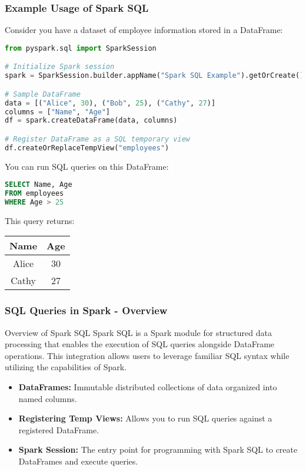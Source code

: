 \documentclass[aspectratio=169]{beamer}
\begin{document}
\begin{frame}[fragile]
    \frametitle{Example Usage of Spark SQL}
    Consider you have a dataset of employee information stored in a DataFrame:

    \begin{lstlisting}[language=Python]
from pyspark.sql import SparkSession

# Initialize Spark session
spark = SparkSession.builder.appName("Spark SQL Example").getOrCreate()

# Sample DataFrame
data = [("Alice", 30), ("Bob", 25), ("Cathy", 27)]
columns = ["Name", "Age"]
df = spark.createDataFrame(data, columns)

# Register DataFrame as a SQL temporary view
df.createOrReplaceTempView("employees")
    \end{lstlisting}

    You can run SQL queries on this DataFrame:
    \begin{lstlisting}[language=SQL]
SELECT Name, Age
FROM employees
WHERE Age > 25
    \end{lstlisting}

    This query returns:
    \begin{tabular}{|c|c|}
        \hline
        Name  & Age \\
        \hline
        Alice & 30  \\
        Cathy & 27  \\
        \hline
    \end{tabular}
\end{frame}

\begin{frame}[fragile]
  \frametitle{SQL Queries in Spark - Overview}
  \begin{block}{Overview of Spark SQL}
    Spark SQL is a Spark module for structured data processing that enables the execution of SQL queries alongside DataFrame operations. This integration allows users to leverage familiar SQL syntax while utilizing the capabilities of Spark.
  \end{block}

  \begin{itemize}
    \item \textbf{DataFrames:} Immutable distributed collections of data organized into named columns.
    \item \textbf{Registering Temp Views:} Allows you to run SQL queries against a registered DataFrame.
    \item \textbf{Spark Session:} The entry point for programming with Spark SQL to create DataFrames and execute queries.
  \end{itemize}
\end{frame}
\end{document}
